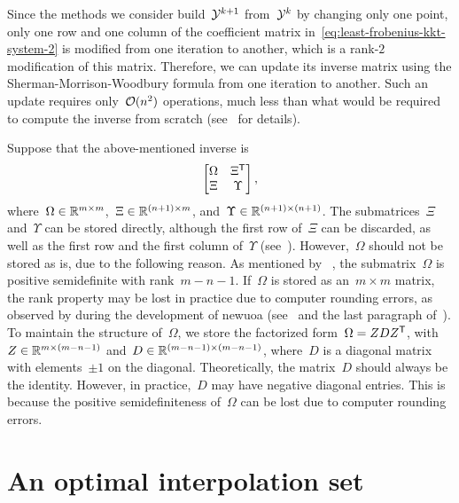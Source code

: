 Since the methods we consider build~$\xpt[k + 1]$ from~$\xpt[k]$ by changing only one point, only one row and one column of the coefficient matrix in~\cref{eq:least-frobenius-kkt-system-2} is modified from one iteration to another, which is a rank-$2$ modification of this matrix.
Therefore, we can update its inverse matrix using the Sherman-Morrison-Woodbury formula from one iteration to another.
Such an update requires only~$\operatorname{\mathcal{O}}(n^2)$ operations, much less than what would be required to compute the inverse from scratch (see~\cite[\S~2]{Powell_2004c} for details).

Suppose that the above-mentioned inverse is
\begin{equation*}
    \begin{bmatrix}
        \Omega  & \Xi^{\mathsf{T}}\\
        \Xi     & \Upsilon
    \end{bmatrix},
\end{equation*}
where~$\Omega \in \mathbb{R}^{m \times m}$,~$\Xi \in \mathbb{R}^{(n + 1) \times m}$, and~$\Upsilon \in \mathbb{R}^{(n + 1) \times (n + 1)}$.
The submatrices~$\Xi$ and~$\Upsilon$ can be stored directly, although the first row of~$\Xi$ can be discarded, as well as the first row and the first column of~$\Upsilon$ (see~\cite[\S~4]{Powell_2006}).
However,~$\Omega$ should not be stored as is, due to the following reason.
As mentioned by \citeauthor{Powell_2004c}~\cite{Powell_2004c}, the submatrix~$\Omega$ is positive semidefinite with rank~$m - n - 1$.
If~$\Omega$ is stored as an~$m \times m$ matrix, the rank property may be lost in practice due to computer rounding errors, as observed by \citeauthor{Powell_2004c} during the development of \gls{newuoa} (see~\cite[\S~1]{Powell_2004c} and the last paragraph of~\cite[\S~8]{Powell_2006}).
To maintain the structure of~$\Omega$, we store the factorized form~$\Omega = Z D Z^{\mathsf{T}}$, with~$Z \in \mathbb{R}^{m \times (m - n - 1)}$ and~$D \in \mathbb{R}^{(m - n - 1) \times (m - n - 1)}$, where~$D$ is a diagonal matrix with elements~$\pm 1$ on the diagonal.
Theoretically, the matrix~$D$ should always be the identity.
However, in practice,~$D$ may have negative diagonal entries.
This is because the positive semidefiniteness of~$\Omega$ can be lost due to computer rounding errors.

\section{An optimal interpolation set}
\label{sec:optimal-interpolation-set}

